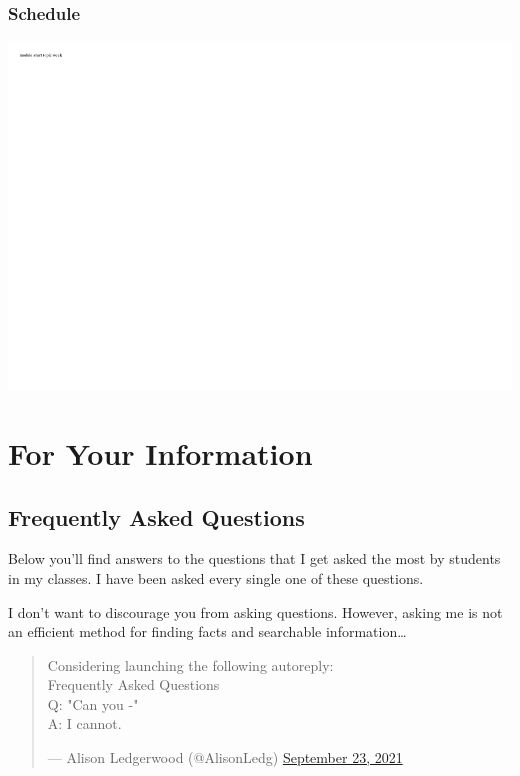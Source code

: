 \hypertarget{schedule-3}{%
\section*{Schedule}\label{schedule-3}}


\includegraphics{0204_datascience_files/figure-latex/unnamed-chunk-3-1.pdf}

\hypertarget{part-for-your-information}{%
\part*{For Your Information}\label{part-for-your-information}}


\hypertarget{frequently-asked-questions}{%
\chapter{Frequently Asked Questions}\label{frequently-asked-questions}}

Below you'll find answers to the questions that I get asked the most by students in my classes. I have been asked every single one of these questions.

I don't want to discourage you from asking questions. However, asking me is not an efficient method for finding facts and searchable information\ldots{}

\begin{quote}
Considering launching the following autoreply:\\
Frequently Asked Questions\\
Q: "Can you -"\\
A: I cannot.

\begin{flushright}--- Alison Ledgerwood (@AlisonLedg) \href{https://twitter.com/AlisonLedg/status/1441181845706579969}{September 23,
2021}\end{flushright}
\end{quote}

